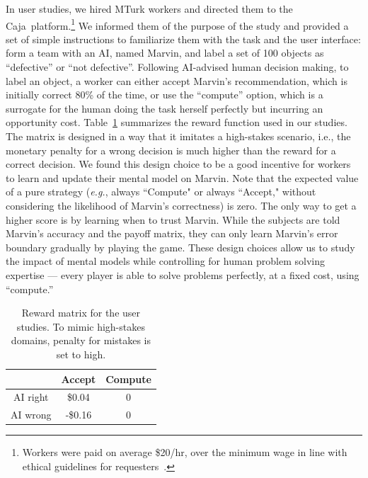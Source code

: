 \documentclass[letterpaper]{article} %
\newcommand{\eg}{\mbox{\it e.g.}}
\newcommand{\?}{\mbox{?}}
\newcommand{\name}{AI-advised human decision making}
\newcommand{\plat}{{\sc Caja}}
\begin{document}
 In user studies, we hired MTurk workers and directed them to the \plat\ platform.\footnote{Workers were paid on average \$20/hr, over the minimum wage in line with  ethical guidelines for requesters~\cite{dynamo-MT-ethics17}.} We informed them of the purpose of the study and provided a set of simple instructions to familiarize them with the task and the user interface: form a team with an AI, named Marvin, and label a set of 100 objects as ``defective'' or ``not defective''.  
Following \name, to label an object, a worker can either accept Marvin's recommendation, which is initially correct 80\% of the time, or use the ``compute'' option, which is a surrogate for the human doing the task herself perfectly but incurring an opportunity cost.
Table~\ref{tab:payoff} summarizes the reward function  used in our studies. The matrix is designed in a way that it imitates a high-stakes scenario, i.e., the monetary penalty for a wrong decision is much higher than the reward for a correct decision. We found this design choice to be a good incentive for workers to learn and update their mental model on Marvin.  %
Note that the expected value of a pure strategy (\eg, always ``Compute"  or always ``Accept," without considering the likelihood of Marvin's correctness) is zero. The only way to get a higher score is by learning when to trust Marvin. While the subjects are told  Marvin's accuracy and the payoff matrix, they can only learn Marvin's error boundary gradually by playing the game.   These design choices allow us to study the impact of mental models while controlling for human problem solving expertise --- every player is able to solve  problems perfectly, at a fixed cost,  using ``compute.''\\


\begin{table}[t]
    \centering
    \begin{tabular}{|c|c|c|}
    \hline
         & Accept & Compute  \\
         \hline
         AI right & \$0.04 & 0 \\
         \hline
         AI wrong & -\$0.16 & 0\\
         \hline
    \end{tabular}
    \caption{Reward matrix for the user studies. To mimic high-stakes domains, penalty for mistakes is set to high. 
    }
    \label{tab:payoff}
\end{table}
\end{document}
